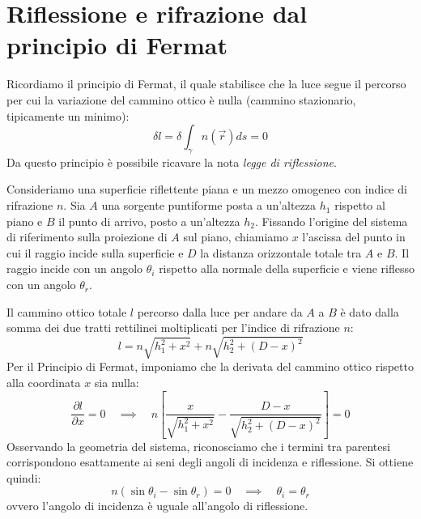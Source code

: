 \documentclass[openany,a4paper,12pt]{book}
\begin{document}
\section{Riflessione e rifrazione dal principio di Fermat}
Ricordiamo il principio di Fermat, il quale stabilisce che la luce segue il percorso per cui la variazione del cammino ottico è nulla (cammino stazionario, tipicamente un minimo):
\begin{equation}
    \delta l = \delta \int_\gamma n(\vec r) ds = 0 
\end{equation}
Da questo principio è possibile ricavare la nota \textit{legge di riflessione}. 

Consideriamo una superficie riflettente piana e un mezzo omogeneo con indice di rifrazione $n$. Sia $A$ una sorgente puntiforme posta a un'altezza $h_1$ rispetto al piano e $B$ il punto di arrivo, posto a un'altezza $h_2$. Fissando l'origine del sistema di riferimento sulla proiezione di $A$ sul piano, chiamiamo $x$ l'ascissa del punto in cui il raggio incide sulla superficie e $D$ la distanza orizzontale totale tra $A$ e $B$. 
Il raggio incide con un angolo $\theta_i$ rispetto alla normale della superficie e viene riflesso con un angolo $\theta_r$.

Il cammino ottico totale $l$ percorso dalla luce per andare da $A$ a $B$ è dato dalla somma dei due tratti rettilinei moltiplicati per l'indice di rifrazione $n$:
\begin{equation}
    l = n \sqrt{h_1^2 + x^2} + n \sqrt{h_2^2 + (D-x)^2} 
\end{equation}
Per il Principio di Fermat, imponiamo che la derivata del cammino ottico rispetto alla coordinata $x$ sia nulla:
\begin{equation}
    \frac{\partial l}{\partial x} = 0 \quad \implies \quad n \left[ \frac{x}{\sqrt{h_1^2 + x^2}} - \frac{D-x}{\sqrt{h_2^2 + (D-x)^2}} \right] = 0 
\end{equation}
Osservando la geometria del sistema, riconosciamo che i termini tra parentesi corrispondono esattamente ai seni degli angoli di incidenza e riflessione. Si ottiene quindi:
\begin{equation}
    n (\sin \theta_i - \sin \theta_r) = 0 \quad \implies \quad \theta_i = \theta_r
\end{equation}
ovvero l'angolo di incidenza è uguale all'angolo di riflessione.
\end{document}
